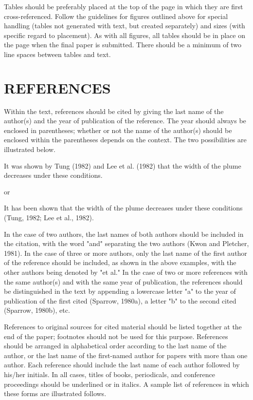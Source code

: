 \documentclass[twocolumn,10pt]{tsfp}
\begin{document}
Tables should be preferably placed at the top of the page in which they are first cross-referenced. Follow the guidelines for figures outlined above for special handling (tables not generated with text, but created separately) and sizes (with specific regard to placement). As with all figures, all tables should be in place on the page when the final paper is submitted. There should be a minimum of two line spaces between tables and text.

\section*{REFERENCES}

Within the text, references should be cited by giving the last name of the author(s) and the year of publication of the reference. The year should always be enclosed in parentheses; whether or not the name of the author(s) should be enclosed within the parentheses depends on the context. The two possibilities are illustrated below.

It was shown by Tung (1982) and Lee et al. (1982) that the width of the plume decreases under these conditions.

or

It has been shown that the width of the plume decreases under these conditions (Tung, 1982; Lee et al., 1982).

In the case of two authors, the last names of both authors should be included in the citation, with the word "and" separating the two authors (Kwon and Pletcher, 1981). In the case of three or more authors, only the last name of the first author of the reference should be included, as shown in the above examples, with the other authors being denoted by "et al." In the case of two or more references with the same author(s) and with the same year of publication, the references should be distinguished in the text by appending a lowercase letter "a" to the year of publication of the first cited (Sparrow, 1980a), a letter "b" to the second cited (Sparrow, 1980b), etc.

References to original sources for cited material should be listed together at the end of the paper; footnotes should not be used for this purpose. References should be arranged in alphabetical order according to the last name of the author, or the last name of the first-named author for papers with more than one author. Each reference should include the last name of each author followed by his/her initials. In all cases, titles of books, periodicals, and conference proceedings should be underlined or in italics. A sample list of references in which these forms are illustrated follows.
\end{document}
